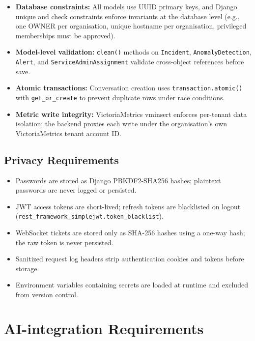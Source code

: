 \begin{itemize}
  \item \textbf{Database constraints:} All models use UUID primary keys, and
        Django unique and check constraints enforce invariants at the
        database level (e.g., one OWNER per organisation,
        unique hostname per organisation, privileged memberships must be
        approved).
  \item \textbf{Model-level validation:} \texttt{clean()} methods on
        \texttt{Incident}, \texttt{AnomalyDetection}, \texttt{Alert}, and
        \texttt{ServiceAdminAssignment} validate cross-object references before
        save.
  \item \textbf{Atomic transactions:} Conversation creation uses
        \texttt{transaction.atomic()} with \texttt{get\_or\_create} to prevent
        duplicate rows under race conditions.
  \item \textbf{Metric write integrity:} VictoriaMetrics vminsert enforces
        per-tenant data isolation; the backend proxies each write under the
        organisation's own VictoriaMetrics tenant account ID.
\end{itemize}

\subsection{Privacy Requirements}

\begin{itemize}
  \item Passwords are stored as Django PBKDF2-SHA256 hashes; plaintext passwords
        are never logged or persisted.
  \item JWT access tokens are short-lived; refresh tokens are blacklisted on
        logout (\texttt{rest\_framework\_simplejwt.token\_blacklist}).
  \item WebSocket tickets are stored only as SHA-256 hashes
        using a one-way hash; the raw token is never persisted.
  \item Sanitized request log headers strip authentication cookies and tokens
        before storage.
  \item Environment variables containing secrets are loaded at runtime and
        excluded from version control.
\end{itemize}

\section{AI-integration Requirements}

